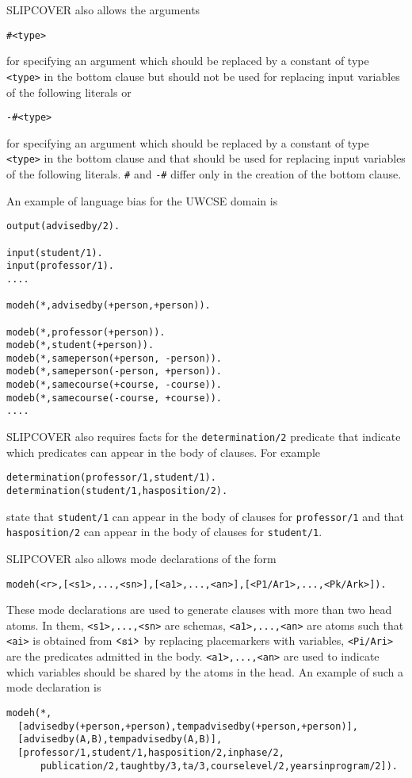 \documentclass[a4paper,10pt]{article}
\begin{document}
SLIPCOVER also allows the arguments
\begin{verbatim}
#<type>
\end{verbatim}
for specifying an argument which should be replaced by a constant of type \texttt{<type>} in the bottom clause but should not be used for replacing input variables of the following literals or 
\begin{verbatim}
-#<type>
\end{verbatim}
for specifying an argument which should be replaced by a constant of type \texttt{<type>} in the bottom clause and that should be used for replacing input variables of the following literals. \verb|#| and \verb|-#| differ only in the creation of the bottom clause.

An example of language bias for the UWCSE domain is
\begin{verbatim}
output(advisedby/2).

input(student/1).
input(professor/1).
....

modeh(*,advisedby(+person,+person)). 

modeb(*,professor(+person)).
modeb(*,student(+person)).
modeb(*,sameperson(+person, -person)). 
modeb(*,sameperson(-person, +person)). 
modeb(*,samecourse(+course, -course)). 
modeb(*,samecourse(-course, +course)). 
....
\end{verbatim}
SLIPCOVER also requires facts for the \verb|determination/2| predicate that indicate which predicates can appear in the body of clauses. 
For example
\begin{verbatim}
determination(professor/1,student/1).
determination(student/1,hasposition/2).
\end{verbatim}
state that \verb|student/1| can appear in the body of clauses for \verb|professor/1| and that \verb|hasposition/2| can appear in 
the body of clauses for \verb|student/1|.

SLIPCOVER also allows mode declarations of the form
\begin{verbatim}
modeh(<r>,[<s1>,...,<sn>],[<a1>,...,<an>],[<P1/Ar1>,...,<Pk/Ark>]). 
\end{verbatim}
These mode declarations are used to generate clauses with more than two head atoms. In them, \verb|<s1>,...,<sn>| are schemas,  \verb|<a1>,...,<an>| are atoms such that \verb|<ai>| is obtained from $\verb|<si>|$ by replacing placemarkers with variables, 
\verb|<Pi/Ari>| are the predicates admitted in the body. \verb|<a1>,...,<an>| are used to indicate which variables should be shared by the atoms in the head.
An example of such a mode declaration is
\begin{verbatim}
modeh(*,
  [advisedby(+person,+person),tempadvisedby(+person,+person)],
  [advisedby(A,B),tempadvisedby(A,B)],
  [professor/1,student/1,hasposition/2,inphase/2,
	  publication/2,taughtby/3,ta/3,courselevel/2,yearsinprogram/2]).
\end{verbatim}
\end{document}
